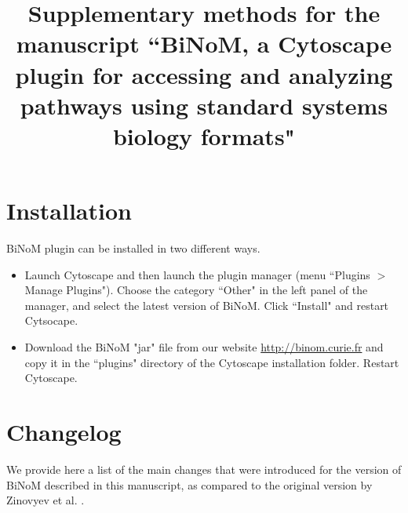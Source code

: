 \documentclass[a4paper,10pt]{article}
\title{Supplementary methods for the manuscript ``BiNoM, a Cytoscape plugin for accessing and analyzing pathways using
standard systems biology formats"}
\author{}
\begin{document}
\maketitle



\section*{Installation}

BiNoM plugin can be installed in two different ways.

\begin{itemize}
 \item Launch Cytoscape and then launch the plugin manager (menu ``Plugins $>$ Manage
Plugins"). Choose the category ``Other" in the left panel of the manager, and
select the latest version of BiNoM. Click ``Install" and restart Cytsocape. 
  \item Download the BiNoM "jar" file from our website
\url{http://binom.curie.fr} and copy it in the ``plugins" directory of the
Cytoscape installation folder. Restart Cytoscape. 
\end{itemize}


\section*{Changelog}
We provide here a list of the main changes that were introduced for the version
of BiNoM described in this manuscript, as compared to the original version by
Zinovyev et al. \cite{zinovyev2008binom}.
\end{document}
